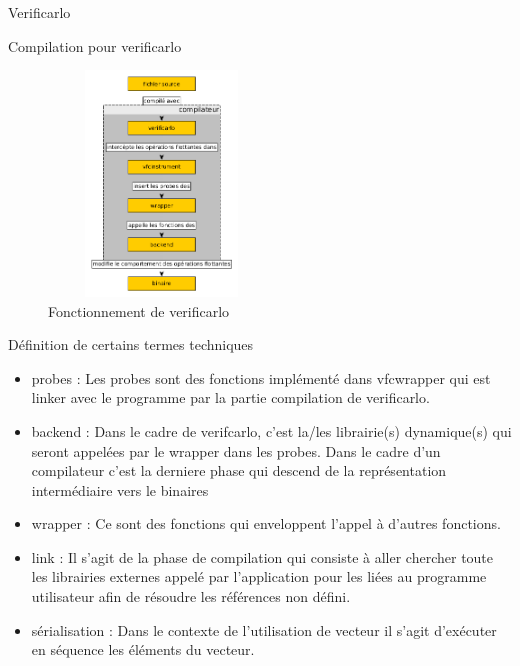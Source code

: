 \documentclass{beamer}
\begin{document}
\begin{frame}{Verificarlo}
    \begin{block}{Compilation pour verificarlo}
      \begin{figure}
          \centering
          \includegraphics[width=6cm,height=6cm]{../ressources/verificarlo_works.png}
          \caption{Fonctionnement de verificarlo}
          \label{fig:my_label}
      \end{figure}
    \end{block}
\end{frame}

\begin{frame}{Définition de certains termes techniques}
      \begin{itemize}
          \item probes : Les probes sont des fonctions implémenté dans vfcwrapper qui est linker avec le programme par la partie compilation de verificarlo.
          \item backend : Dans le cadre de verifcarlo, c’est la/les librairie(s) dynamique(s) qui seront appelées par le wrapper dans les probes. Dans le cadre d’un compilateur c’est la derniere phase qui descend de la représentation intermédiaire vers le binaires
          \item wrapper : Ce sont des fonctions qui enveloppent l’appel à d’autres fonctions.
          \item link : Il s’agit de la phase de compilation qui consiste à aller chercher toute les librairies externes appelé par l’application pour les liées au programme utilisateur afin de résoudre les références non défini.
          \item sérialisation : Dans le contexte de l’utilisation de vecteur il s’agit d’exécuter en séquence les éléments du vecteur.
      \end{itemize}
\end{frame}
\end{document}
